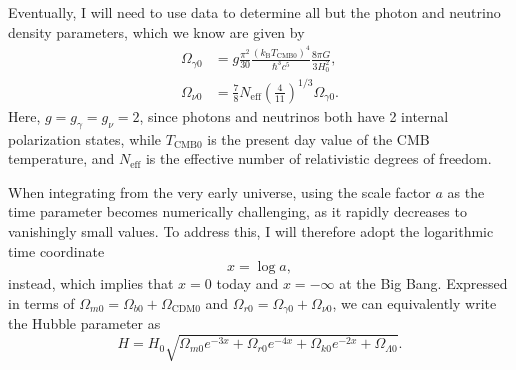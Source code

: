 \documentclass{aa}
\begin{document}
Eventually, I will need to use data to determine all but the photon and neutrino density parameters, which we know are given by
\begin{align}
    \Omega_{\gamma0} &= g\frac{\pi^2}{30}\frac{\left(k_\text{B}T_{\text{CMB}0}\right)^4}{\hbar^3c^5}\frac{8\pi G}{3H_0^2},
    \\
    \Omega_{\nu0} &= \frac{7}{8}N_\text{eff}\left(\frac{4}{11}\right)^{1/3}\Omega_{\gamma0}.
\end{align}
Here, $g=g_\gamma=g_\nu=2$, since photons and neutrinos both have 2 internal polarization states, while $T_{\text{CMB}0}$ is the present day value of the CMB temperature, and $N_\text{eff}$ is the effective number of relativistic degrees of freedom. 

When integrating from the very early universe, using the scale factor $a$ as the time parameter becomes numerically challenging, as it rapidly decreases to vanishingly small values. To address this, I will therefore adopt the logarithmic time coordinate
\begin{equation}
    x = \log a,
\end{equation}
instead, which implies that $x=0$ today and $x=-\infty$ at the Big Bang. Expressed in terms of $\Omega_{m0}=\Omega_{b0}+\Omega_{\text{CDM}0}$ and $\Omega_{r0}=\Omega_{\gamma0}+\Omega_{\nu0}$, we can equivalently write the Hubble parameter as
\begin{equation}
    H = H_0 \sqrt{\Omega_{m0} e^{-3x} + \Omega_{r0} e^{-4x} + \Omega_{k0} e^{-2x} + \Omega_{\Lambda 0}}.
\end{equation}
\end{document}
